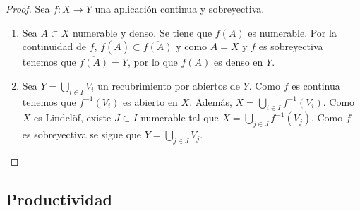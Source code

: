 \begin{proof}
Sea $\displaystyle f : X \to Y $ una aplicación continua y sobreyectiva. 
\begin{enumerate}
\item Sea $\displaystyle A \subset X $ numerable y denso. Se tiene que $\displaystyle f\left(A\right) $ es numerable. Por la continuidad de $\displaystyle f $, $\displaystyle f\left(\overline{A}\right)\subset \overline{f\left(A\right)} $ y como $\displaystyle \overline{A} = X $ y $\displaystyle f $ es sobreyectiva tenemos que $\displaystyle \overline{f\left(A\right)}= Y $, por lo que $\displaystyle f\left(A\right) $ es denso en $\displaystyle Y $.
\item Sea $\displaystyle Y = \bigcup_{i \in I}V_{i} $ un recubrimiento por abiertos de $\displaystyle Y $.
	Como $\displaystyle f $ es continua tenemos que $\displaystyle f^{-1}\left(V_{i}\right) $ es abierto en $\displaystyle X $. Además, $\displaystyle X = \bigcup_{i \in I}f^{-1}\left(V_{i}\right) $.
	Como $\displaystyle X $ es Lindelöf, existe $\displaystyle J \subset I $ numerable tal que $\displaystyle X = \bigcup_{j \in J}f^{-1}\left(V_{j}\right) $. Como $\displaystyle f $ es sobreyectiva se sigue que $\displaystyle Y = \bigcup_{j \in J}V_{j} $. 
\end{enumerate}
\end{proof}
\subsection*{Productividad}

